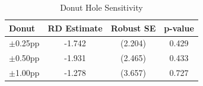 \begin{table}[!h]
\centering
\caption{\label{tab:tab:donut}Donut Hole Sensitivity}
\centering
\begin{tabular}[t]{lccc}
\toprule
Donut & RD Estimate & Robust SE & p-value\\
\midrule
$\pm$0.25pp & -1.742 & (2.204) & 0.429\\
$\pm$0.50pp & -1.931 & (2.465) & 0.433\\
$\pm$1.00pp & -1.278 & (3.657) & 0.727\\
\bottomrule
\end{tabular}
\end{table}
